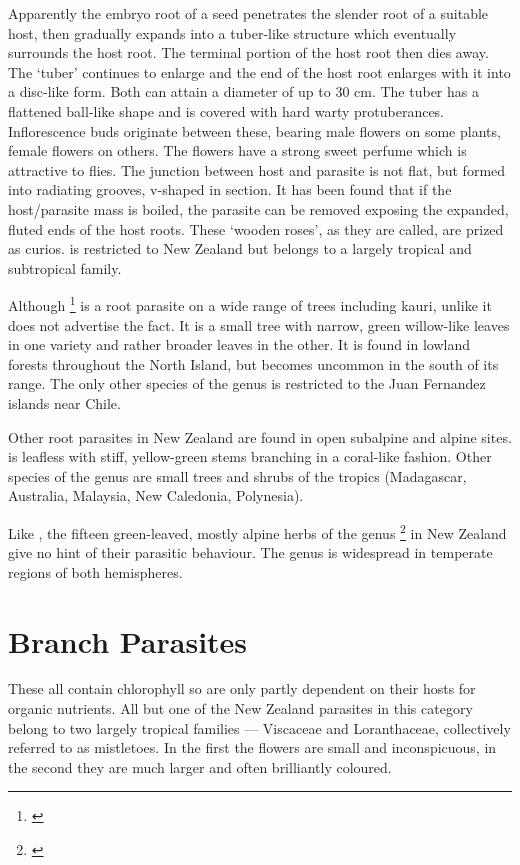 Apparently the embryo root of a  seed penetrates the slender root of a suitable host, then gradually expands into a tuber-like structure which eventually surrounds the host root.
The terminal portion of the host root then dies away.
The `tuber' continues to enlarge and the end of the host root enlarges with it into a disc-like form.
Both can attain a diameter of up to 30 cm.
The tuber has a flattened ball-like shape and is covered with hard warty protuberances.
Inflorescence buds originate between these, bearing male flowers on some plants, female flowers on others.
The flowers have a strong sweet perfume which is attractive to flies.
The junction between host and parasite is not flat, but formed into radiating grooves, v-shaped in section.
It has been found that if the host/parasite mass is boiled, the parasite can be removed exposing the expanded, fluted ends of the host roots.
These `wooden roses', as they are called, are prized as curios.  is restricted to New Zealand but belongs to a largely tropical and subtropical family.

Although \footnote{\cite{philipson1959some}} is a root parasite on a wide range of trees including kauri, unlike  it does not advertise the fact.
It is a small tree with narrow, green willow-like leaves in one variety and rather broader leaves in the other.
It is found in lowland forests throughout the North Island, but becomes uncommon in the south of its range.
The only other species of the genus is restricted to the Juan Fernandez islands near Chile.

Other root parasites in New Zealand are found in open subalpine and alpine sites.  is leafless with stiff, yellow-green stems branching in a coral-like fashion.
Other species of the genus are small trees and shrubs of the tropics (Madagascar, Australia, Malaysia, New Caledonia, Polynesia).

Like , the fifteen green-leaved, mostly alpine herbs of the genus \footnote{\cite{philipson1959some}} in New Zealand give no hint of their parasitic behaviour.
The genus is widespread in temperate regions of both hemispheres.

\section{Branch Parasites}

These all contain chlorophyll so are only partly dependent on their hosts for organic nutrients.
All but one of the New Zealand parasites in this category belong to two largely tropical families — Viscaceae and Loranthaceae, collectively referred to as mistletoes.
In the first the flowers are small and inconspicuous, in the second they are much larger and often brilliantly coloured.

